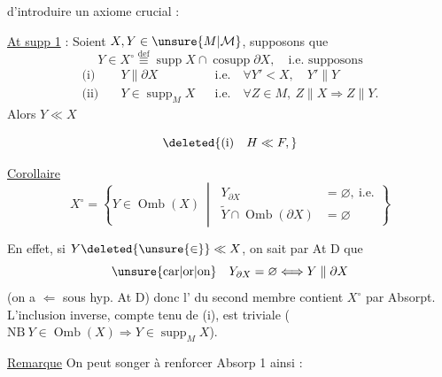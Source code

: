 

 d'introduire un axiome  crucial :

\uline{At supp 1} : Soient $X,Y\in\unsure{M|\mathcal M}$, supposons que
\[
Y\in X^\circ\overset{\mathrm{def}}{\equiv}\operatorname{supp}X\cap\operatorname{cosupp}\partial X,\quad\text{i.e. supposons}
\]
\[
\begin{aligned}
\text{(i)}\quad &Y\parallel\partial X &&\text{i.e.}\quad\forall Y'<X,\quad Y'\parallel Y\\
\text{(ii)}\quad &Y\in\operatorname{supp}_{M}X &&\text{i.e.}\quad\forall Z\in M,\ Z\parallel X\Rightarrow Z\parallel Y.
\end{aligned}
\]
Alors $Y\ll X$ \deleted{$\unsure{\Longleftrightarrow}$}

\[
\deleted{\text{(i)}\quad H\ll F,}
\]

\uline{Corollaire}
\[
X^\circ=\left\{Y\in\operatorname{Omb}(X)\ \middle|\ \begin{aligned}Y_{\partial X}&=\varnothing,\ \text{i.e.}\\ \widetilde Y\cap\operatorname{Omb}(\partial X)&=\varnothing\end{aligned}\right\}
\]

En effet, si $Y\deleted{\unsure{\in}}\ll X$,  on sait par At D que
\[
\text{\unsure{car|or|on}}\quad Y_{\partial X}=\varnothing\Longleftrightarrow Y\parallel\partial X
\]
(on a $\Leftarrow$ sous hyp. At D) donc l' du second membre  contient $X^\circ$ par Absorpt. L'inclusion inverse, compte tenu de (i), est triviale ($\mathrm{NB}\ Y\in\operatorname{Omb}(X)\Rightarrow Y\in\operatorname{supp}_{M}X$).

\uline{Remarque} On peut songer à renforcer Absorp 1 ainsi :

